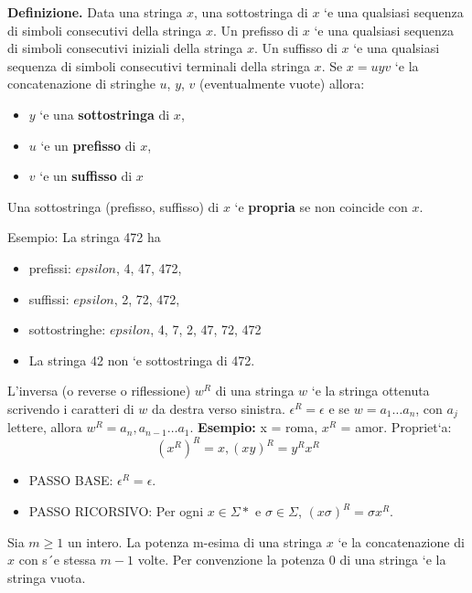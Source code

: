 \textbf{Definizione.} Data una stringa \(x\), una sottostringa di \(x\) `e una qualsiasi
sequenza di simboli consecutivi della stringa \(x\). Un prefisso di
\(x\) `e una qualsiasi sequenza di simboli consecutivi iniziali della
stringa \(x\). Un suffisso di \(x\) `e una qualsiasi sequenza di simboli
consecutivi terminali della stringa \(x\).
Se \(x = uyv\) `e la concatenazione di stringhe \(u\), \(y\), \(v\)
(eventualmente vuote) allora:
\begin{itemize}
    \item \(y\) `e una \textbf{sottostringa} di \(x\),
    \item \(u\) `e un \textbf{prefisso} di \(x\),
    \item \(v\) `e un \textbf{suffisso} di \(x\)
\end{itemize}
Una sottostringa (prefisso, suffisso) di \(x\) `e \textbf{propria} se non
coincide con \(x\).

Esempio: La stringa 472 ha
\begin{itemize}
    \item prefissi: \(epsilon\), 4, 47, 472,
    \item suffissi: \(epsilon\), 2, 72, 472,
    \item sottostringhe: \(epsilon\), 4, 7, 2, 47, 72, 472
    \item La stringa 42 non `e sottostringa di 472.
\end{itemize}

L’inversa (o reverse o riflessione) \(w^R\) di una stringa \(w\) `e la stringa
ottenuta scrivendo i caratteri di \(w\) da destra verso sinistra.
\(\epsilon^R = \epsilon\) e se \(w = a_1 \dots a_n\), con \(a_j\)
lettere, allora
\(w^R = a_n, a_{n-1} \dots a_1\).
\textbf{Esempio:} x = roma, \(x^R\) = amor.
Propriet`a:
\[(x^R)^R = x, (xy)^R = y^Rx^R\]

\begin{itemize}
    \item PASSO BASE: \(\epsilon^R = \epsilon\).
    \item PASSO RICORSIVO: Per ogni \(x \in \Sigma*\) e \(\sigma \in \Sigma\), \((x\sigma)^R = \sigma x^R\).
\end{itemize}

Sia \(m \geq 1\) un intero. La potenza m-esima di una stringa \(x\) `e
la concatenazione di \(x\) con s´e stessa \(m - 1\) volte.
Per convenzione la potenza 0 di una stringa `e la stringa vuota.

\vspace{5mm}

